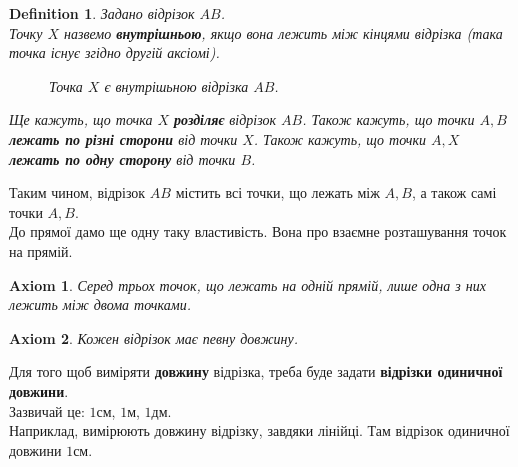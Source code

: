 \documentclass[a4paper, 10pt]{article}
\theoremstyle{theoremdd}
\theoremstyle{theoremdd}
\newtheorem{axiom}{Axiom}
\theoremstyle{theoremdd}
\newtheorem{definition}[theorem]{Definition}
\theoremstyle{theoremdd}
\theoremstyle{theoremdd}
\theoremstyle{theoremdd}
\theoremstyle{theoremdd}
\theoremstyle{theoremdd}
\theoremstyle{theoremdd}
\begin{document}
\begin{definition}
Задано відрізок $AB$.\\
Точку $X$ назвемо \textbf{внутрішньою}, якщо вона лежить між кінцями відрізка (така точка існує згідно другій аксіомі).
\begin{figure}[H]
\centering
{}
\caption*{Точка $X$ є внутрішьною відрізка $AB$.}
\end{figure}
Ще кажуть, що точка $X$ \textbf{розділяє} відрізок $AB$. Також кажуть, що точки $A,B$ \textbf{лежать по різні сторони} від точки $X$. Також кажуть, що точки $A,X$ \textbf{лежать по одну сторону} від точки $B$.
\end{definition}
Таким чином, відрізок $AB$ містить всі точки, що лежать між $A,B$, а також самі точки $A,B$.
\bigskip \\
До прямої дамо ще одну таку властивість. Вона про взаємне розташування точок на прямій.

\begin{axiom}
Серед трьох точок, що лежать на одній прямій, лише одна з них лежить між двома точками.
\end{axiom}

\begin{axiom}
Кожен відрізок має певну довжину.
\end{axiom}

Для того щоб виміряти \textbf{довжину} відрізка, треба буде задати \textbf{відрізки одиничної довжини}.\\
Зазвичай це: $1$см, $1$м, $1$дм.\\
Наприклад, вимірюють довжину відрізку, завдяки лінійці. Там відрізок одиничної довжини $1$см.
\end{document}
